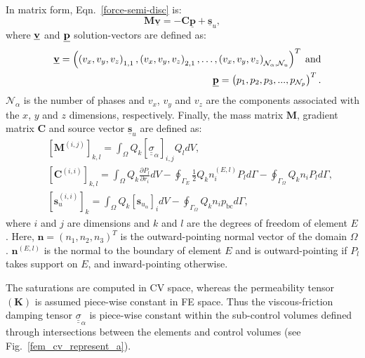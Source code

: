 \documentclass[times]{fldauth}
\begin{document}
In matrix form, Eqn.~\ref{force-semi-disc} is:
\begin{equation}
  {\mathbf M} \underline {\mathbf v} = -{\mathbf C} \underline
  {\mathbf p} + \underline {\mathbf
    s}_{u}, \label{force-balance-matrix-form}
\end{equation}
where $\underline{\bf v}$ and $\underline{\bf p}$ solution-vectors are
defined as:
\begin{eqnarray}
  &&\underline{{\bf v}} = \left( 
  \left( {v_x},{v_y},{v_z} \right)  _{1,1},
  \left( {v_x},{v_y},{v_z} \right)  _{2,1},\ldots,
  \left( {v_x},{v_y},{v_z} \right)  _{\mathcal{N}_\alpha,\mathcal{N}_u}
  \right)^{T}
  \;\text{and} \nonumber \\ &&
  \underline{{\bf p}} = \left(p_1, p_2, p_3, ...,
  p_{\mathcal{N}_p}\right)^T. \nonumber \nonumber
\end{eqnarray}
$\mathcal{N}_{\alpha}$ is the number of phases and $v_x$, $v_y$ and
$v_z$ are the components associated with the $x$, $y$ and $z$
dimensions, respectively. Finally, the mass matrix ${\mathbf M}$,
gradient matrix ${\mathbf C}$ and source vector $\underline {\mathbf
  s}_{u}$ are defined as:
\begin{eqnarray}
  && \left[{\mathbf M}^{(i,j)}\right]_{k,l} = \int_{\Omega} Q_{k}
  \left[\underline{\underline{\sigma}}_{\alpha}\right]_{i,j} {Q}_{l}
  dV, \nonumber \\ && {\left[\bm{C}^{(i,i)}\right]_{k,l} =
    \int_{\Omega} Q_{k} \frac{\partial P_{l}}{\partial r_i} dV -
    \oint_{\Gamma_{E}} \displaystyle\frac{1}{2} Q_{k} n_i^{(E,l)}
    P_{l} d\Gamma - \oint_{\Gamma_{\Omega}} \displaystyle Q_{k} n_i
    P_{l} d\Gamma}, \nonumber \\ &&
  {\left[\bm{s}_{u}^{(i,i)}\right]_{k} = \int_{\Omega} Q_k}
  \left[{\mathbf s}_{u_\alpha} \right]_i dV -
  \oint_{\Gamma_{\Omega}}\displaystyle Q_{k} n_i p_\text{bc} d\Gamma,
  \nonumber
\end{eqnarray}
where $i$ and $j$ are dimensions and $k$ and $l$ are the degrees of
freedom of element $E$. Here, $\bm{n} = \left(n_{1}, n_{2},
n_{3}\right)^{T}$ is the outward-pointing normal vector of the domain
$\Omega$. $\bm{n}^{(E,l)}$ is the normal to the boundary of element
$E$ and is outward-pointing if $P_{l}$ takes support on $E$, and
inward-pointing otherwise.

The saturations are computed in CV space, whereas the permeability
tensor $\left(\mathbf{K}\right)$ is assumed piece-wise constant in FE
space. Thus the viscous-friction damping tensor $ {\underline
  {\underline \sigma}}_{\alpha}$ is piece-wise constant within the
sub-control volumes defined through intersections between the elements
and control volumes (see Fig.~\ref{fem_cv_represent_a}).
\end{document}
